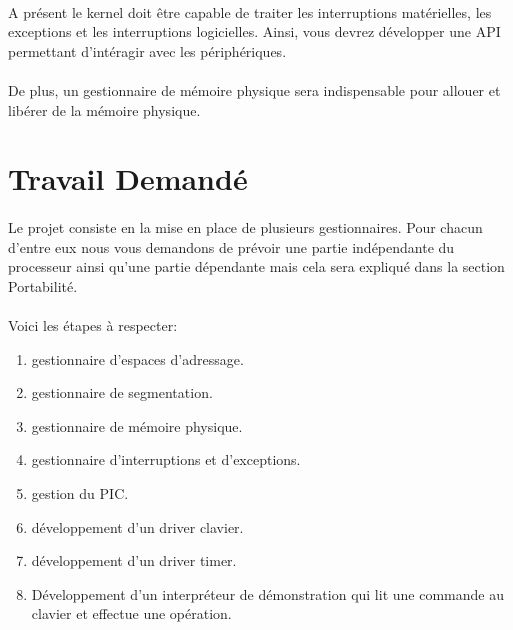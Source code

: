 \documentclass[10pt,a4wide]{article}
\begin{document}
\paragraph{}

A pr\'esent le kernel doit \^etre capable de traiter les interruptions
mat\'erielles, les exceptions et les interruptions logicielles. Ainsi,
vous devrez d\'evelopper une API permettant d'int\'eragir avec les
p\'eriph\'eriques.

\paragraph{}

De plus, un gestionnaire de m\'emoire physique sera indispensable pour allouer
et lib\'erer de la m\'emoire physique.

\section{Travail Demand\'e}

\paragraph{}

Le projet consiste en la mise en place de plusieurs gestionnaires. Pour chacun
d'entre eux nous vous demandons de pr\'evoir une partie ind\'ependante du
processeur ainsi qu'une partie d\'ependante mais cela sera expliqu\'e
dans la section Portabilit\'e.

\paragraph{}

Voici les \'etapes \`a respecter:

\begin{enumerate}
\item gestionnaire d'espaces d'adressage.
\item gestionnaire de segmentation.
\item gestionnaire de m\'emoire physique.
\item gestionnaire d'interruptions et d'exceptions.
\item gestion du PIC.
\item d\'eveloppement d'un driver clavier.
\item d\'eveloppement d'un driver timer.
\item D\'eveloppement d'un interpr\'eteur de d\'emonstration qui lit
      une commande au clavier et effectue une op\'eration.
\end{enumerate}
\end{document}
